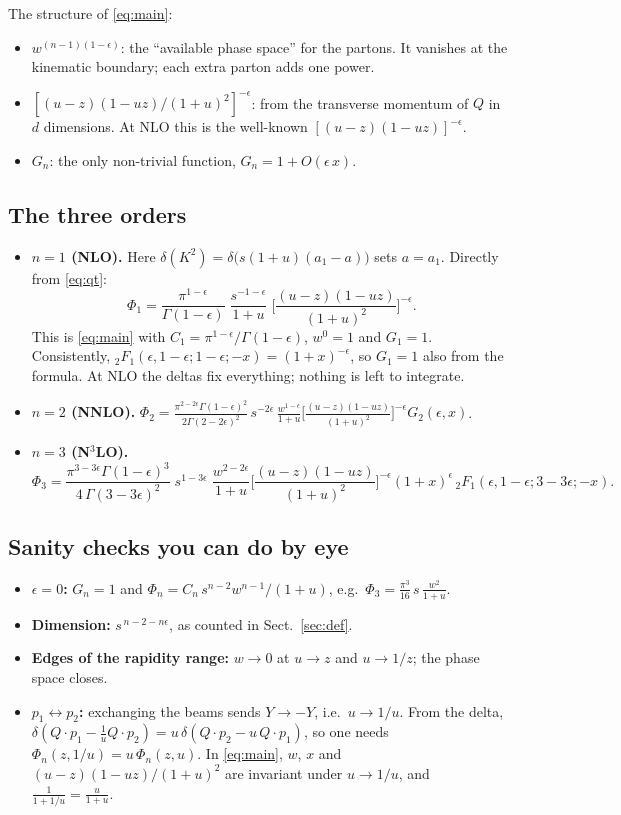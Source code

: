 \documentclass[11pt,a4paper]{article}
\newcommand{\ep}{\epsilon}
\newcommand{\F}{{}_2F_1}
\begin{document}
The structure of \eqref{eq:main}:
\begin{itemize}
\item $w^{(n-1)(1-\ep)}$: the ``available phase space'' for the partons. It vanishes at the kinematic boundary;
  each extra parton adds one power.
\item $[(u-z)(1-uz)/(1+u)^2]^{-\ep}$: from the transverse momentum of $Q$ in $d$ dimensions. At NLO this is the
  well-known $[(u-z)(1-uz)]^{-\ep}$.
\item $G_n$: the only non-trivial function, $G_n=1+O(\ep\,x)$.
\end{itemize}

\subsection{The three orders}
\begin{itemize}
\item \textbf{$n=1$ (NLO).} Here $\delta(K^2)=\delta\big(s(1+u)(a_1-a)\big)$ sets $a=a_1$. Directly from
  \eqref{eq:qt}:
  \[\Phi_1=\frac{\pi^{1-\ep}}{\Gamma(1-\ep)}\;\frac{s^{-1-\ep}}{1+u}\;\Big[\frac{(u-z)(1-uz)}{(1+u)^2}\Big]^{-\ep}.\]
  This is \eqref{eq:main} with $C_1=\pi^{1-\ep}/\Gamma(1-\ep)$, $w^0=1$ and $G_1=1$. Consistently,
  $\F(\ep,1-\ep;1-\ep;-x)=(1+x)^{-\ep}$, so $G_1=1$ also from the formula. At NLO the deltas fix everything; nothing
  is left to integrate.
\item \textbf{$n=2$ (NNLO).}
  $\Phi_2=\frac{\pi^{2-2\ep}\Gamma(1-\ep)^2}{2\Gamma(2-2\ep)^2}\,s^{-2\ep}\,
  \frac{w^{1-\ep}}{1+u}\big[\tfrac{(u-z)(1-uz)}{(1+u)^2}\big]^{-\ep}G_2(\ep,x)$.
\item \textbf{$n=3$ (N$^3$LO).}
  \[\Phi_3=\frac{\pi^{3-3\ep}\Gamma(1-\ep)^3}{4\,\Gamma(3-3\ep)^2}\;s^{1-3\ep}\;
  \frac{w^{2-2\ep}}{1+u}\Big[\frac{(u-z)(1-uz)}{(1+u)^2}\Big]^{-\ep}(1+x)^{\ep}\,\F(\ep,1-\ep;3-3\ep;-x).\]
\end{itemize}

\subsection{Sanity checks you can do by eye}
\begin{itemize}
\item \textbf{$\ep=0$:} $G_n=1$ and $\Phi_n=C_n\,s^{n-2}w^{n-1}/(1+u)$, e.g.\ $\Phi_3=\frac{\pi^3}{16}\,s\,\frac{w^2}{1+u}$.
\item \textbf{Dimension:} $s^{\,n-2-n\ep}$, as counted in Sect.~\ref{sec:def}.
\item \textbf{Edges of the rapidity range:} $w\to0$ at $u\to z$ and $u\to1/z$; the phase space closes.
\item \textbf{$p_1\leftrightarrow p_2$:} exchanging the beams sends $Y\to-Y$, i.e.\ $u\to1/u$. From the delta,
  $\delta(Q\cdot p_1-\tfrac1u Q\cdot p_2)=u\,\delta(Q\cdot p_2-u\,Q\cdot p_1)$, so one needs
  $\Phi_n(z,1/u)=u\,\Phi_n(z,u)$. In \eqref{eq:main}, $w$, $x$ and $(u-z)(1-uz)/(1+u)^2$ are invariant under
  $u\to1/u$, and $\frac1{1+1/u}=\frac u{1+u}$. \checkmark
\end{itemize}
\end{document}
